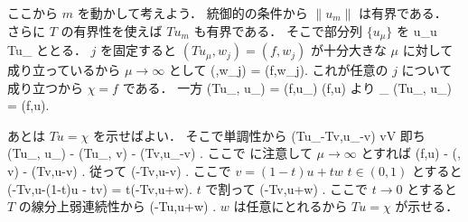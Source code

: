 ここから $m$ を動かして考えよう．
統御的の条件から $\|u_m\|$ は有界である．
さらに $T$ の有界性を使えば $Tu_m$ も有界である．
そこで部分列 $\{u_\mu\}$ を
\bg %
u_\mu \to u  \\
Tu_\mu \to \chi {}
\eg %
ととる．
$j$ を固定すると $(Tu_\mu,w_j) = (f,w_j)$ が十分大きな $\mu$ に対して
成り立っているから $\mu\to\infty$ として
\bdm %
(\chi,w_j) = (f,w_j).
\edm %
これが任意の $j$ について成り立つから $\chi=f$ である．
一方
\bdm %
(Tu_\mu, u_\mu) = (f,u_\mu) \to (f,u)
\edm %
より
\bdn %
\lim_{\mu\to\infty} (Tu_\mu, u_\mu) = (f,u).
\edn %

あとは $Tu=\chi$ を示せばよい．
そこで単調性から
\bdm %
(Tu_\mu-Tv,u_\mu-v)  \quad \forall v\in V
\edm %
即ち
\bdm %
(Tu_\mu, u_\mu) - (Tu_\mu, v) - (Tv,u_\mu-v) .
\edm %
ここで  に注意して $\mu\to\infty$ とすれば
\bdm %
(f,u) - (\chi, v) - (Tv,u-v) .
\edm %
従って
\bdm %
(\chi-Tv,u-v) .
\edm %
ここで $v=(1-t)u + tw$ $t\in(0,1)$ とすると
\le (\chi-Tv,u-(1-t)u - tv)
= t(\chi-Tv,u+w).
\edm %
$t$ で割って
\bdm %
(\chi-Tv,u+w) .
\edm %
ここで $t\to 0$ とすると $T$ の線分上弱連続性から
\bdm %
(\chi-Tu,u+w) .
\edm %
$w$ は任意にとれるから $Tu=\chi$ が示せる．


